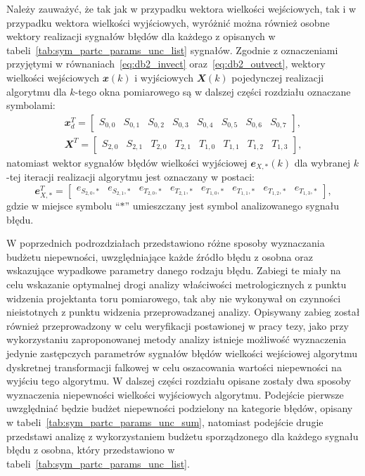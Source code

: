 Należy zauważyć, że tak jak w przypadku wektora wielkości wejściowych, tak i w przypadku wektora wielkości wyjściowych, wyróżnić można również osobne wektory realizacji sygnałów błędów dla każdego z opisanych w tabeli~\ref{tab:sym_partc_params_unc_list} sygnałów. Zgodnie z oznaczeniami przyjętymi w równaniach~\eqref{eq:db2_invect} oraz~\eqref{eq:db2_outvect}, wektory wielkości wejściowych $\mathbfit{x}(k)$ i wyjściowych $\mathbfit{X}(k)$ pojedynczej realizacji algorytmu dla $k$-tego okna pomiarowego są w dalszej części rozdziału oznaczane symbolami:
\begin{gather}
\mathbfit{x}_{d}^{T} =
\begin{bmatrix}
S_{0,0} & S_{0,1} & S_{0,2} & S_{0,3} & S_{0,4} & S_{0,5} & S_{0,6} & S_{0,7}
\end{bmatrix}
\label{eq:sym_partd_invect}, \\
\mathbfit{X}^{T} =
\begin{bmatrix}
S_{2,0} & S_{2,1} & T_{2,0} & T_{2,1} & T_{1,0} & T_{1,1} & T_{1,2} & T_{1,3}
\end{bmatrix}
\label{eq:sym_partd_outvect},
\end{gather}
natomiast wektor sygnałów błędów wielkości wyjściowej $\mathbfit{e}_{X,*}(k)$ dla wybranej $k$-tej iteracji realizacji algorytmu jest oznaczany w postaci:
\begin{equation}
\mathbfit{e}_{X,*}^{T} =
\begin{bmatrix}
e_{S_{2,0},*} & e_{S_{2,1},*} & e_{T_{2,0},*} & e_{T_{2,1},*} & e_{T_{1,0},*} & e_{T_{1,1},*} & e_{T_{1,2},*} & e_{T_{1,3},*}
\end{bmatrix}
\label{eq:sym_partd_errvect},
\end{equation}
gdzie w miejsce symbolu \enquote{$*$} umieszczany jest symbol analizowanego sygnału błędu.

W poprzednich podrozdziałach przedstawiono różne sposoby wyznaczania budżetu niepewności, uwzględniające każde źródło błędu z osobna oraz wskazujące wypadkowe parametry danego rodzaju błędu. Zabiegi te miały na celu wskazanie optymalnej drogi analizy właściwości metrologicznych z punktu widzenia projektanta toru pomiarowego, tak aby nie wykonywał on czynności nieistotnych z punktu widzenia przeprowadzanej analizy. Opisywany zabieg został również przeprowadzony w celu weryfikacji postawionej w pracy tezy, jako przy wykorzystaniu zaproponowanej metody analizy istnieje możliwość wyznaczenia jedynie zastępczych parametrów sygnałów błędów wielkości wejściowej algorytmu dyskretnej transformacji falkowej w celu oszacowania wartości niepewności na wyjściu tego algorytmu. W dalszej części rozdziału opisane zostały dwa sposoby wyznaczenia niepewności wielkości wyjściowych algorytmu. Podejście pierwsze uwzględniać będzie budżet niepewności podzielony na kategorie błędów, opisany w tabeli~\ref{tab:sym_partc_params_unc_sum}, natomiast podejście drugie przedstawi analizę z wykorzystaniem budżetu sporządzonego dla każdego sygnału błędu z osobna, który przedstawiono w tabeli~\ref{tab:sym_partc_params_unc_list}.


